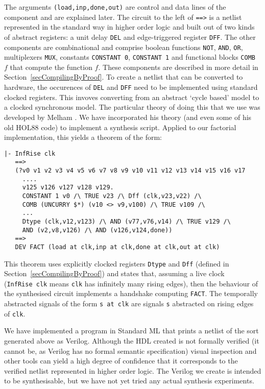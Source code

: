 The arguments \texttt{(load,inp,done,out)} are control and data lines of the component
and are explained later. The circuit to the left of \texttt{==>} is a netlist represented in
the standard way in higher order logic \cite{Mel93} and built out of
two kinds of abstract registers: a unit delay \texttt{DEL} and
edge-triggered register \texttt{DFF}. The other components are
combinational and comprise boolean functions \texttt{NOT},
\texttt{AND}, \texttt{OR}, multiplexers \texttt{MUX}, constants
\texttt{CONSTANT~0}, \texttt{CONSTANT~1} and functional blocks
\texttt{COMB~$f$} that compute the function $f$. These components are
described in more detail in Section~\ref{secCompilingByProof}. To
create a netlist that can be converted to hardware, the occurences of
\texttt{DEL} and \texttt{DFF} need to be implemented using standard
clocked registers. This invoves converting from an abstract `cycle
based' model to a clocked synchronous model. The particular theory of doing this that we use
was developed by Melham \cite{Mel93}. We have incorporated
his theory (and even some of his old HOL88 code) to
implement a synthesis script. Applied to our factorial implementation, this yields
a theorem of the form:

\vspace*{-1mm}

{\baselineskip10pt\begin{verbatim}
|- InfRise clk
   ==>
   (?v0 v1 v2 v3 v4 v5 v6 v7 v8 v9 v10 v11 v12 v13 v14 v15 v16 v17 
     ....
     v125 v126 v127 v128 v129.
     CONSTANT 1 v0 /\ TRUE v23 /\ Dff (clk,v23,v22) /\
     COMB (UNCURRY $*) (v10 <> v9,v100) /\ TRUE v109 /\
     ...
     Dtype (clk,v12,v123) /\ AND (v77,v76,v14) /\ TRUE v129 /\
     AND (v2,v8,v126) /\ AND (v126,v124,done)) 
   ==>
   DEV FACT (load at clk,inp at clk,done at clk,out at clk) 
\end{verbatim}}

\vspace*{-2mm}

This theorem uses explicitly clocked registers \texttt{Dtype} and
\texttt{Dff} (defined in Section~\ref{secCompilingByProof}) and states
that, assuming a live clock (\texttt{InfRise~clk} means \texttt{clk}
has infinitely many rising edges), then the behaviour of the
synthesised circuit implements a handshake computing
\texttt{FACT}. The temporally abstracted signals of the form \texttt{s~at~clk} are
signals \texttt{s} abstracted on rising edges of \texttt{clk}.

We have implemented a program in Standard ML that prints a netlist of
the sort generated above as Verilog. Although the HDL created is not
formally verified (it cannot be, as Verilog has no formal semantic
specification) visual inspection and other tools can yield a high
degree of confidence that it corresponds to the verified netlist
represented in higher order logic. The Verilog we create is intended
to be synthesisable, but we have not yet tried any actual synthesis
experiments.


